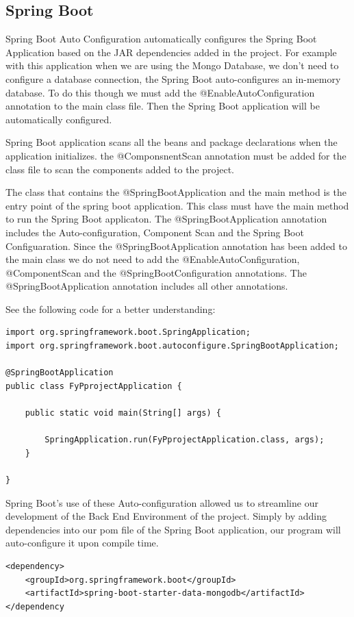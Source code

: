 \subsection{Spring Boot}
Spring Boot Auto Configuration automatically configures the Spring Boot Application based on the JAR dependencies added in the project. For example with this application when we are using the Mongo Database, we don't need to configure a database connection, the Spring Boot auto-configures an in-memory database. To do this though we must add the @EnableAutoConfiguration annotation to the main class file. Then the Spring Boot application will be automatically configured.\par
Spring Boot application scans all the beans and package declarations when the application initializes. the @ComponsnentScan annotation must be added for the class file to scan the components added to the project. \par
The class that contains the @SpringBootApplication and the main method is the entry point of the spring boot application. This class must have the main method to run the Spring Boot applicaton. The @SpringBootApplication annotation includes the Auto-configuration, Component Scan and the Spring Boot Configuaration. Since the @SpringBootApplication annotation has been added to the main class we do not need to add the @EnableAutoConfiguration, @ComponentScan and the @SpringBootConfiguration annotations. The @SpringBootApplication annotation includes all other annotations. \par
See the following code for a better understanding:
\begin{verbatim}
import org.springframework.boot.SpringApplication;
import org.springframework.boot.autoconfigure.SpringBootApplication;

@SpringBootApplication
public class FyPprojectApplication {

	public static void main(String[] args) {

		SpringApplication.run(FyPprojectApplication.class, args);
	}

}
\end{verbatim}
Spring Boot's use of these Auto-configuration allowed us to streamline our development of the Back End Environment of the project. Simply by adding dependencies into our pom file of the Spring Boot application, our program will auto-configure it upon compile time. \par
\begin{verbatim}
<dependency>
	<groupId>org.springframework.boot</groupId>
	<artifactId>spring-boot-starter-data-mongodb</artifactId>
</dependency
\end{verbatim}

